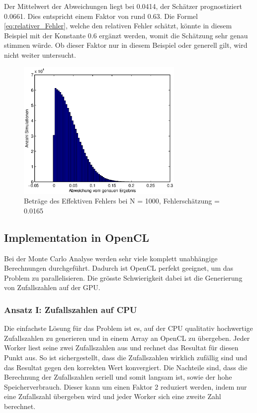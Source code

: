\documentclass{book}
\begin{document}
\begin{refsection}
Der Mittelwert der Abweichungen liegt bei 0.0414, der Schätzer prognostiziert 0.0661. Dies entspricht einem Faktor von rund 0.63. Die Formel \ref{eq:relativer_Fehler}, welche den relativen Fehler schätzt, könnte in diesem Beispiel mit der Konstante 0.6 ergänzt werden, womit die Schätzung sehr genau stimmen würde. Ob dieser Faktor nur in diesem Beispiel oder generell gilt, wird nicht weiter untersucht.

\begin{figure}[h]
    \centering
    \includegraphics[width=8cm]{images/Histogramm.eps}
    \caption{Beträge des Effektiven Fehlers bei N = 1000, Fehlerschätzung = 0.0165}
    \label{fig:Histogramm}
\end{figure}



\subsection{Implementation in OpenCL}
Bei der Monte Carlo Analyse werden sehr viele komplett unabhängige Berechnungen durchgeführt. Dadurch ist OpenCL perfekt geeignet, um das Problem zu parallelisieren. Die grösste Schwierigkeit dabei ist die Generierung von Zufallszahlen auf der GPU. 

\subsubsection{Ansatz I: Zufallszahlen auf CPU}
Die einfachste Lösung für das Problem ist es, auf der CPU qualitativ hochwertige Zufallszahlen zu generieren und in einem Array an OpenCL zu übergeben. Jeder Worker liest seine zwei Zufallszahlen aus und rechnet das Resultat für diesen Punkt aus. So ist sichergestellt, dass die Zufallszahlen wirklich zufällig sind und das Resultat gegen den korrekten Wert konvergiert. Die Nachteile sind, dass die Berechnung der Zufallszahlen seriell und somit langsam ist, sowie der hohe Speicherverbrauch. Dieser kann um einen Faktor 2 reduziert werden, indem nur eine Zufallszahl übergeben wird und jeder Worker sich eine zweite Zahl berechnet. \\


\end{refsection}
\end{document}
